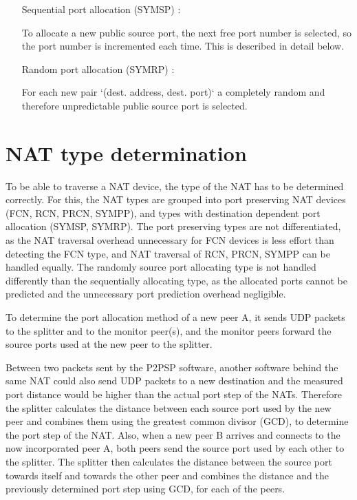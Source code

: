 \documentclass{article}
\begin{document}
\begin{itemize}
\begin{itemize}
\item [Sequential port allocation (SYMSP)]:

To allocate a new public source port, the next free port number is
selected, so the port number is incremented each time. This is
described in detail below.

\item [Random port allocation (SYMRP)]:

For each new pair `(dest. address, dest. port)` a completely random
and therefore unpredictable public source port is selected.

\end{itemize}

\end{itemize}

\section{NAT type determination}

To be able to traverse a NAT device, the type of the NAT has to be
determined correctly. For this, the NAT types are grouped into port
preserving NAT devices (FCN, RCN, PRCN, SYMPP), and types with
destination dependent port allocation (SYMSP, SYMRP). The port
preserving types are not differentiated, as the NAT traversal overhead
unnecessary for FCN devices is less effort than detecting the FCN
type, and NAT traversal of RCN, PRCN, SYMPP can be handled equally.
The randomly source port allocating type is not handled differently
than the sequentially allocating type, as the allocated ports cannot
be predicted and the unnecessary port prediction overhead negligible.

To determine the port allocation method of a new peer A, it sends UDP
packets to the splitter and to the monitor peer(s), and the monitor
peers forward the source ports used at the new peer to the splitter.

Between two packets sent by the P2PSP software, another software
behind the same NAT could also send UDP packets to a new destination
and the measured port distance would be higher than the actual port
step of the NATs. Therefore the splitter calculates the distance
between each source port used by the new peer and combines them using
the greatest common divisor (GCD), to determine the port step of the
NAT. Also, when a new peer B arrives and connects to the now
incorporated peer A, both peers send the source port used by each
other to the splitter. The splitter then calculates the distance
between the source port towards itself and towards the other peer and
combines the distance and the previously determined port step using
GCD, for each of the peers.
\end{document}
